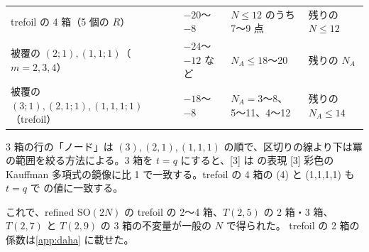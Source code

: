 \begin{compresult}
\begin{center}
\begin{tabular}{llll}
trefoil の 4 箱（5 個の $R$） & $-20$〜$-8$ & $N \le 12$ のうち 7〜9 点 & 残りの $N \le 12$ \\
被覆の $(2;1), (1,1;1)$（$m = 2, 3, 4$） & $-24$〜$-12$ など & $N_A \le 18$〜20 & 残りの $N_A$ \\
被覆の $(3;1), (2,1;1), (1,1,1;1)$（trefoil） & $-18$〜$-8$ & $N_A = 3$〜8、5〜11、4〜12 & 残りの $N_A \le 14$ \\
\bottomrule
\end{tabular}
\end{center}
3 箱の行の「ノード」は $(3), (2,1), (1,1,1)$ の順で、区切りの線より下は冪の範囲を絞る方法による。3 箱を $t = q$ にすると、[3] は \cite{NRZ13} の表現 [3] 彩色の Kauffman 多項式の鏡像に比 1 で一致する。trefoil の 4 箱の (4) と (1,1,1,1) も $t = q$ で \cite{NRZ13} の値に一致する。
\end{compresult}
これで、refined SO$(2N)$ の trefoil の 2〜4 箱、$T(2,5)$ の 2 箱・3 箱、$T(2,7)$ と $T(2,9)$ の 3 箱の不変量が一般の $N$ で得られた。
trefoil の 2 箱の係数は\ref{app:daha} に載せた。

